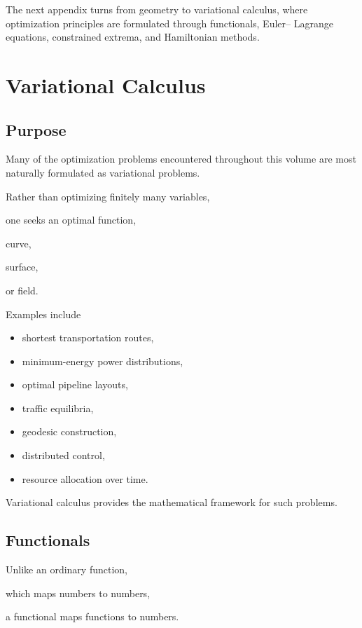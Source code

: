 \documentclass[11pt,fleqn]{book}
\numberwithin{equation}{chapter}
\theoremstyle{plain}
\theoremstyle{definition}
\theoremstyle{remark}
\begin{document}
The next appendix turns from geometry to variational calculus, where
optimization principles are formulated through functionals, Euler--
Lagrange equations, constrained extrema, and Hamiltonian methods.

\chapter{Variational Calculus}

\section{Purpose}

Many of the optimization problems encountered throughout this volume are
most naturally formulated as variational problems.

Rather than optimizing finitely many variables,

one seeks an optimal function,

curve,

surface,

or field.

Examples include

\begin{itemize}
\item shortest transportation routes,
\item minimum-energy power distributions,
\item optimal pipeline layouts,
\item traffic equilibria,
\item geodesic construction,
\item distributed control,
\item resource allocation over time.
\end{itemize}

Variational calculus provides the mathematical framework for such
problems.


\section{Functionals}

Unlike an ordinary function,

which maps numbers to numbers,

a functional maps functions to numbers.
\end{document}
